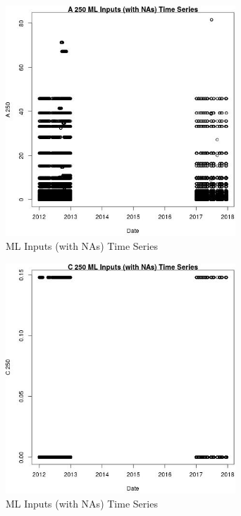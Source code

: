 \begin{figure} 
\centering  
\includegraphics[width=0.77\textwidth]{Code_Outputs/Report_ML_input_PM25_Step4_part_e_de_duplicated_aves_compiled_2019-05-14wNAs_A_250vDate.jpg} 
\caption{\label{fig:Report_ML_input_PM25_Step4_part_e_de_duplicated_aves_compiled_2019-05-14wNAsA_250vDate}ML Inputs (with NAs) Time Series} 
\end{figure} 
 

\begin{figure} 
\centering  
\includegraphics[width=0.77\textwidth]{Code_Outputs/Report_ML_input_PM25_Step4_part_e_de_duplicated_aves_compiled_2019-05-14wNAs_C_250vDate.jpg} 
\caption{\label{fig:Report_ML_input_PM25_Step4_part_e_de_duplicated_aves_compiled_2019-05-14wNAsC_250vDate}ML Inputs (with NAs) Time Series} 
\end{figure} 
 

